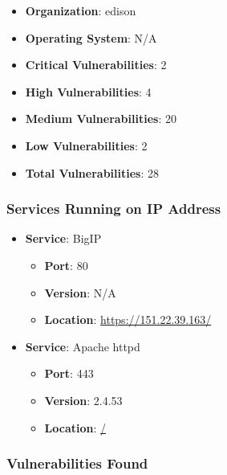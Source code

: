 \documentclass{article}
\begin{document}
\begin{itemize}
    \item \textbf{Organization}: edison
    \item \textbf{Operating System}:  N/A 
    \item \textbf{Critical Vulnerabilities}: 2
    \item \textbf{High Vulnerabilities}: 4
    \item \textbf{Medium Vulnerabilities}: 20
    \item \textbf{Low Vulnerabilities}: 2
    \item \textbf{Total Vulnerabilities}: 28
\end{itemize}

\subsubsection*{Services Running on IP Address}

\begin{itemize}
    
        \item \textbf{Service}: BigIP
        \begin{itemize}
            \item \textbf{Port}: 80
            \item \textbf{Version}:  N/A 
            \item \textbf{Location}: \href{ https://151.22.39.163/ }{ https://151.22.39.163/ }
        \end{itemize}
    
        \item \textbf{Service}: Apache httpd
        \begin{itemize}
            \item \textbf{Port}: 443
            \item \textbf{Version}:  2.4.53 
            \item \textbf{Location}: \href{ / }{ / }
        \end{itemize}
    
\end{itemize}


\subsubsection*{Vulnerabilities Found}
\end{document}
